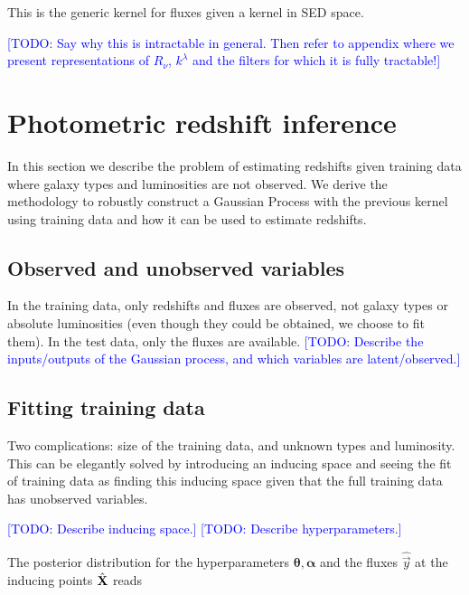 \documentclass[aps,prd,showpacs,superscriptaddress,groupedaddress]{revtex4}  %
\newcommand{\todo}[1]{\textcolor{blue}{[TODO: #1]}}
\begin{document}
This is the generic kernel for fluxes given a kernel in SED space.

\todo{Say why this is intractable in general. Then refer to appendix where we present representations of $R_\nu$, $k^\lambda$ and the filters for which it is fully tractable!}



\section{Photometric redshift inference}

In this section we describe the problem of estimating redshifts given training data where galaxy types and luminosities are not observed.
We derive the methodology to robustly construct a Gaussian Process with the previous kernel using training data and how it can be used to estimate redshifts.

\subsection{Observed and unobserved variables}

In the training data, only redshifts and fluxes are observed, not galaxy types or absolute luminosities (even though they could be obtained, we choose to fit them). 
In the test data, only the fluxes are available.
\todo{Describe the inputs/outputs of the Gaussian process, and which variables are latent/observed.}

\subsection{Fitting training data}


Two complications: size of the training data, and unknown types and luminosity. 
This can be elegantly solved by introducing an inducing space and seeing the fit of training data as finding this inducing space given that the full training data has unobserved variables.

\todo{Describe inducing space.}
\todo{Describe hyperparameters.}

The posterior distribution for the hyperparameters $\bm{\theta}, \bm{\alpha}$ and the fluxes $\hat{\vec{y}}$ at the inducing points $\hat{\mat{X}}$ reads
\end{document}
